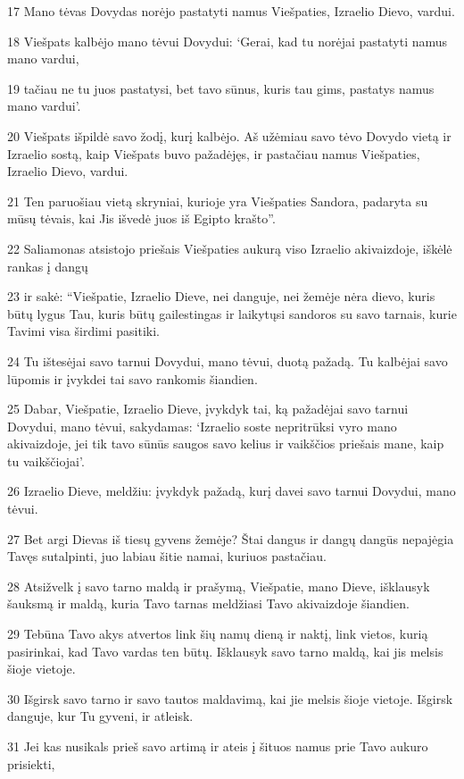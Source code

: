 \par 17 Mano tėvas Dovydas norėjo pastatyti namus Viešpaties, Izraelio Dievo, vardui. 
\par 18 Viešpats kalbėjo mano tėvui Dovydui: ‘Gerai, kad tu norėjai pastatyti namus mano vardui, 
\par 19 tačiau ne tu juos pastatysi, bet tavo sūnus, kuris tau gims, pastatys namus mano vardui’. 
\par 20 Viešpats išpildė savo žodį, kurį kalbėjo. Aš užėmiau savo tėvo Dovydo vietą ir Izraelio sostą, kaip Viešpats buvo pažadėjęs, ir pastačiau namus Viešpaties, Izraelio Dievo, vardui. 
\par 21 Ten paruošiau vietą skryniai, kurioje yra Viešpaties Sandora, padaryta su mūsų tėvais, kai Jis išvedė juos iš Egipto krašto”. 
\par 22 Saliamonas atsistojo priešais Viešpaties aukurą viso Izraelio akivaizdoje, iškėlė rankas į dangų 
\par 23 ir sakė: “Viešpatie, Izraelio Dieve, nei danguje, nei žemėje nėra dievo, kuris būtų lygus Tau, kuris būtų gailestingas ir laikytųsi sandoros su savo tarnais, kurie Tavimi visa širdimi pasitiki. 
\par 24 Tu ištesėjai savo tarnui Dovydui, mano tėvui, duotą pažadą. Tu kalbėjai savo lūpomis ir įvykdei tai savo rankomis šiandien. 
\par 25 Dabar, Viešpatie, Izraelio Dieve, įvykdyk tai, ką pažadėjai savo tarnui Dovydui, mano tėvui, sakydamas: ‘Izraelio soste nepritrūksi vyro mano akivaizdoje, jei tik tavo sūnūs saugos savo kelius ir vaikščios priešais mane, kaip tu vaikščiojai’. 
\par 26 Izraelio Dieve, meldžiu: įvykdyk pažadą, kurį davei savo tarnui Dovydui, mano tėvui. 
\par 27 Bet argi Dievas iš tiesų gyvens žemėje? Štai dangus ir dangų dangūs nepajėgia Tavęs sutalpinti, juo labiau šitie namai, kuriuos pastačiau. 
\par 28 Atsižvelk į savo tarno maldą ir prašymą, Viešpatie, mano Dieve, išklausyk šauksmą ir maldą, kuria Tavo tarnas meldžiasi Tavo akivaizdoje šiandien. 
\par 29 Tebūna Tavo akys atvertos link šių namų dieną ir naktį, link vietos, kurią pasirinkai, kad Tavo vardas ten būtų. Išklausyk savo tarno maldą, kai jis melsis šioje vietoje. 
\par 30 Išgirsk savo tarno ir savo tautos maldavimą, kai jie melsis šioje vietoje. Išgirsk danguje, kur Tu gyveni, ir atleisk. 
\par 31 Jei kas nusikals prieš savo artimą ir ateis į šituos namus prie Tavo aukuro prisiekti, 
